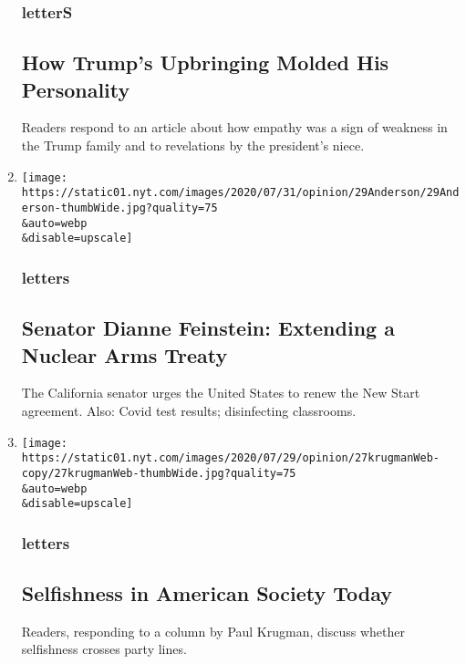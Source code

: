 \begin{enumerate}
  \hypertarget{letters-7}{%
  \subsubsection{letterS}\label{letters-7}}

  \hypertarget{how-trumps-upbringing-molded-his-personality}{%
  \subsection{How Trump's Upbringing Molded His
  Personality}\label{how-trumps-upbringing-molded-his-personality}}

  Readers respond to an article about how empathy was a sign of weakness
  in the Trump family and to revelations by the president's niece.
\item
  \href{/2020/08/03/opinion/letters/nuclear-arms-treaty.html}{}

  \texttt{[image: https://static01.nyt.com/images/2020/07/31/opinion/29Anderson/29Anderson-thumbWide.jpg?quality=75\\\&auto=webp\\\&disable=upscale]}

  \hypertarget{letters-8}{%
  \subsubsection{letters}\label{letters-8}}

  \hypertarget{senator-dianne-feinstein-extending-a-nuclear-arms-treaty}{%
  \subsection{Senator Dianne Feinstein: Extending a Nuclear Arms
  Treaty}\label{senator-dianne-feinstein-extending-a-nuclear-arms-treaty}}

  The California senator urges the United States to renew the New Start
  agreement. Also: Covid test results; disinfecting classrooms.
\item
  \href{/2020/08/03/opinion/letters/selfishness-society.html}{}

  \texttt{[image: https://static01.nyt.com/images/2020/07/29/opinion/27krugmanWeb-copy/27krugmanWeb-thumbWide.jpg?quality=75\\\&auto=webp\\\&disable=upscale]}

  \hypertarget{letters-9}{%
  \subsubsection{letters}\label{letters-9}}

  \hypertarget{selfishness-in-american-society-today}{%
  \subsection{Selfishness in American Society
  Today}\label{selfishness-in-american-society-today}}

  Readers, responding to a column by Paul Krugman, discuss whether
  selfishness crosses party lines.
\end{enumerate}

